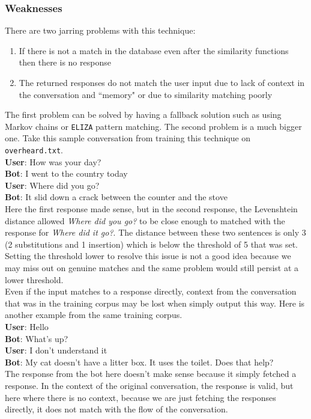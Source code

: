 \documentclass{article}
\newcommand{\n}[0]{\\[\baselineskip]}
\begin{document}
\subsubsection{Weaknesses}
There are two jarring problems with this technique:
\begin{enumerate}
\item If there is not a match in the database even after the similarity functions then there is no response
\item The returned responses do not match the user input due to lack of context in the conversation and ``memory" or due to similarity matching poorly
\end{enumerate}
The first problem can be solved by having a fallback solution such as using Markov chains or \texttt{ELIZA} pattern matching. The second problem is a much bigger one. Take this sample conversation from training this technique on \texttt{overheard.txt}.
\n
\textbf{User}: How was your day?
\\ \textbf{Bot}: I went to the country today
\\ \textbf{User}: Where did you go?
\\ \textbf{Bot}: It slid down a crack between the counter and the stove
\n
Here the first response made sense, but in the second response, the Levenshtein distance allowed \textit{Where did you go?} to be close enough to matched with the response for \textit{Where did it go?}. The distance between these two sentences is only 3 (2 substitutions and 1 insertion) which is below the threshold of 5 that was set. Setting the threshold lower to resolve this issue is not a good idea because we may miss out on genuine matches and the same problem would still persist at a lower threshold. 
\n
Even if the input matches to a response directly, context from the conversation that was in the training corpus may be lost when simply output this way. Here is another example from the same training corpus.
\n
\textbf{User}: Hello
\\ \textbf{Bot}: What's up?
\\ \textbf{User}: I don't understand it
\\ \textbf{Bot}: My cat doesn't have a litter box. It uses the toilet. Does that help?
\n 
The response from the bot here doesn't make sense because it simply fetched a response. In the context of the original conversation, the response is valid, but here where there is no context, because we are just fetching the responses directly, it does not match with the flow of the conversation. 
\end{document}
